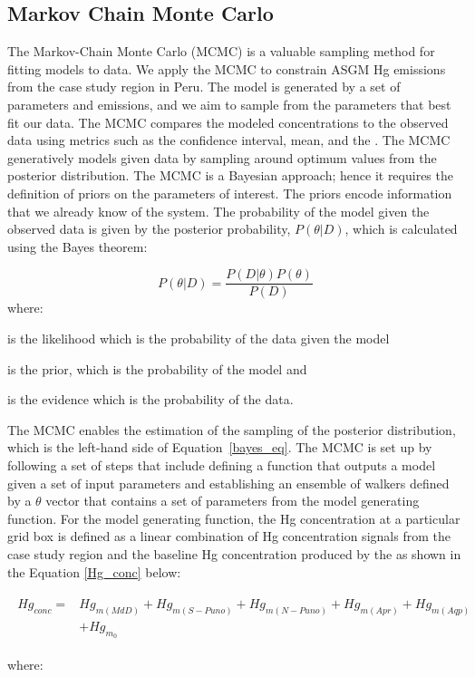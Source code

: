 \subsection{Markov Chain Monte Carlo}

\begin{flushleft}
The Markov-Chain Monte Carlo (MCMC) is a valuable sampling method for fitting models to data\cite{hogg_data_2018}. We apply the MCMC to constrain ASGM Hg emissions from the case study region in Peru.  The model is generated by a set of parameters and emissions, and we aim to sample from the parameters that best fit our data. The MCMC compares the modeled concentrations to the observed data using metrics such as the \nft confidence interval, mean, and the \iq. The MCMC generatively models given data by sampling around optimum values from the posterior distribution. The MCMC is a Bayesian approach; hence it requires the definition of priors on the parameters of interest. The priors encode information that we already know of the system. The probability of the model given the observed data is given by the posterior probability, $P(\theta|D)$, which is calculated using the Bayes theorem:

\begin{equation}
\label{bayes_eq}
P(\theta|D)=\frac{P(D|\theta)P(\theta)}{P(D)}
\end{equation}
where:
\end{flushleft}

\begin{description}[leftmargin=!,labelwidth={3 em}]
    \item [$P(D|\theta)$] is the likelihood which is the probability of the data given the model
    \item [$P(\theta)$] is the prior, which is the probability of the model and 
    \item [$P(D)$] is the evidence which is the probability of the data.
\end{description}

\begin{flushleft}
The MCMC enables the estimation of the sampling of the posterior distribution, which is the left-hand side of Equation~\ref{bayes_eq}. The MCMC is set up by following a set of steps that include defining a function that outputs a model given a set of input parameters and establishing an ensemble of walkers defined by a $\theta$ vector that contains a set of parameters from the model generating function. For the model generating function, the Hg concentration at a particular grid box is defined as a linear combination of Hg concentration signals from the case study region and the baseline Hg concentration produced by the \on as shown in the Equation \ref{Hg_conc} below:

\begin{align}
\begin{split}\label{Hg_conc}
Hg_{conc}= {}&Hg_{m(MdD)}+ Hg_{m(S-Puno)} + Hg_{m(N-Puno)} + Hg_{m(Apr)}+ Hg_{m(Aqp)}\\
            & +Hg_{m_0}
\end{split}
\end{align}

where:
\end{flushleft}

